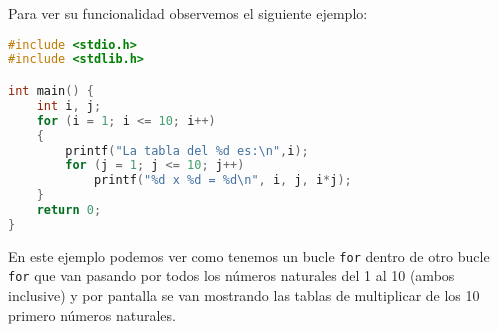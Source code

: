 {Para ver su funcionalidad observemos el siguiente ejemplo:
\begin{Ejemplo}
\begin{lstlisting}[language=C]
#include <stdio.h>
#include <stdlib.h>

int main() {
    int i, j;
    for (i = 1; i <= 10; i++)
    {
        printf("La tabla del %d es:\n",i);
        for (j = 1; j <= 10; j++)
            printf("%d x %d = %d\n", i, j, i*j);
    }
    return 0;
}
\end{lstlisting}
\Explicacion
En este ejemplo podemos ver como tenemos un bucle \texttt{for} dentro de otro bucle \texttt{for} que van pasando por todos los números naturales del 1 al 10 (ambos inclusive) y por pantalla se van mostrando las tablas de multiplicar de los 10 primero números naturales.
\end{Ejemplo}
}